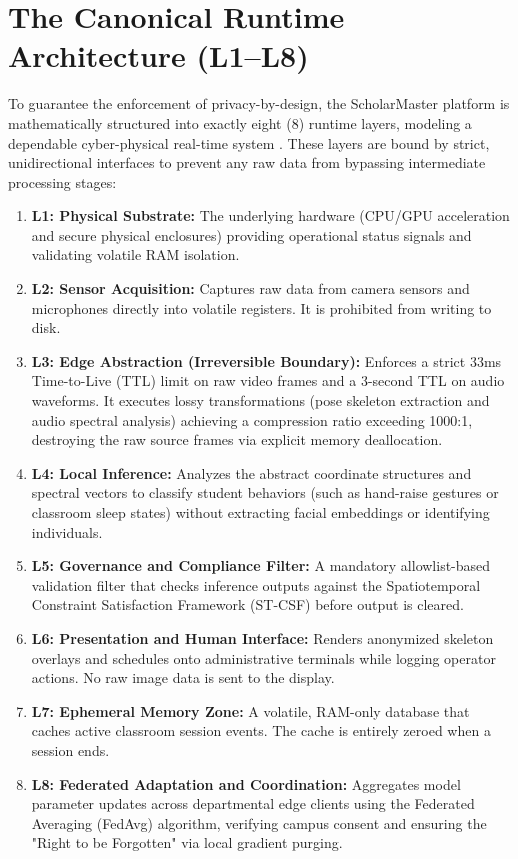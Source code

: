 \documentclass[12pt,a4paper,oneside]{report}
\begin{document}
\section{The Canonical Runtime Architecture (L1--L8)}
To guarantee the enforcement of privacy-by-design, the ScholarMaster platform is mathematically structured into exactly eight (8) runtime layers, modeling a dependable cyber-physical real-time system \cite{kopetz2011realtime, lee2015cps}. These layers are bound by strict, unidirectional interfaces to prevent any raw data from bypassing intermediate processing stages:
\begin{enumerate}
    \item \textbf{L1: Physical Substrate:} The underlying hardware (CPU/GPU acceleration and secure physical enclosures) providing operational status signals and validating volatile RAM isolation.
    \item \textbf{L2: Sensor Acquisition:} Captures raw data from camera sensors and microphones directly into volatile registers. It is prohibited from writing to disk.
    \item \textbf{L3: Edge Abstraction (Irreversible Boundary):} Enforces a strict 33ms Time-to-Live (TTL) limit on raw video frames and a 3-second TTL on audio waveforms. It executes lossy transformations (pose skeleton extraction and audio spectral analysis) achieving a compression ratio exceeding 1000:1, destroying the raw source frames via explicit memory deallocation.
    \item \textbf{L4: Local Inference:} Analyzes the abstract coordinate structures and spectral vectors to classify student behaviors (such as hand-raise gestures or classroom sleep states) without extracting facial embeddings or identifying individuals.
    \item \textbf{L5: Governance and Compliance Filter:} A mandatory allowlist-based validation filter that checks inference outputs against the Spatiotemporal Constraint Satisfaction Framework (ST-CSF) before output is cleared.
    \item \textbf{L6: Presentation and Human Interface:} Renders anonymized skeleton overlays and schedules onto administrative terminals while logging operator actions. No raw image data is sent to the display.
    \item \textbf{L7: Ephemeral Memory Zone:} A volatile, RAM-only database that caches active classroom session events. The cache is entirely zeroed when a session ends.
    \item \textbf{L8: Federated Adaptation and Coordination:} Aggregates model parameter updates across departmental edge clients using the Federated Averaging (FedAvg) algorithm, verifying campus consent and ensuring the "Right to be Forgotten" via local gradient purging.
\end{enumerate}
\end{document}
